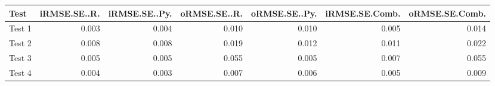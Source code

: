 
\begin{tabular}{l|r|r|r|r|r|r}
\hline
Test & iRMSE.SE..R. & iRMSE.SE..Py. & oRMSE.SE..R. & oRMSE.SE..Py. & iRMSE.SE.Comb. & oRMSE.SE.Comb.\\
\hline
Test 1 & 0.003 & 0.004 & 0.010 & 0.010 & 0.005 & 0.014\\
\hline
Test 2 & 0.008 & 0.008 & 0.019 & 0.012 & 0.011 & 0.022\\
\hline
Test 3 & 0.005 & 0.005 & 0.055 & 0.005 & 0.007 & 0.055\\
\hline
Test 4 & 0.004 & 0.003 & 0.007 & 0.006 & 0.005 & 0.009\\
\hline
\end{tabular}
